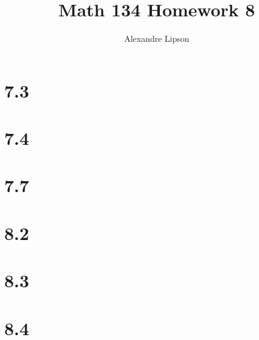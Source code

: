 \documentclass{article}
\title{Math 134 Homework 8}
\author{Alexandre Lipson}
\begin{document}
\maketitle

\section*{7.3}


\section*{7.4}


\section*{7.7}


\section*{8.2}


\section*{8.3}


\section*{8.4}

\end{document}
